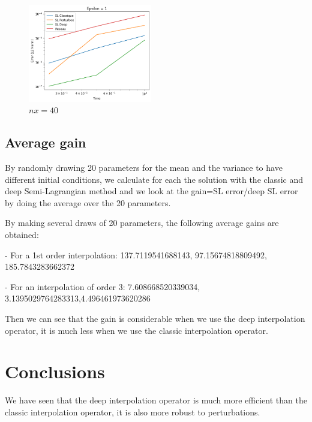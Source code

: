 \documentclass{article}
\begin{document}
\begin{figure}[!h]
    \includegraphics[width=0.48\textwidth]{images/ep25.png}
    \caption{$nx = 40$}
\end{figure}


\newlength{\customspace}
\setlength{\customspace}{2em}
\hspace{\customspace} 
\newpage

\subsection{Average gain}

By randomly drawing 20 parameters for the mean and the variance to have different initial conditions, we calculate for each the solution with the classic and deep Semi-Lagrangian method and we look at the gain=SL error/deep SL error by doing the average over the 20 parameters.\newline 

By making several draws of 20 parameters, the following average gains are obtained:

- For a 1st order interpolation: 137.7119541688143, 97.15674818809492, 185.7843283662372

- For an interpolation of order 3: 7.608668520339034, 3.1395029764283313,4.496461973620286

Then we can see that the gain is considerable when we use the deep interpolation operator, it is much less when we use the classic interpolation operator.\\



\section{Conclusions}

We have seen that the deep interpolation operator is much more efficient than the classic interpolation operator, it is also more robust to perturbations.\\

\end{document}
